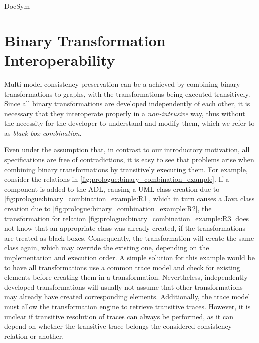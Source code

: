 \begin{copiedFrom}{DocSym}

\section{Binary Transformation Interoperability}

Multi-model consistency preservation can be a achieved by combining binary transformations to graphs, %
with the transformations being executed transitively.
Since all binary transformations are developed independently of each other, it is necessary that they interoperate properly in a \emph{non-intrusive} way, thus without the necessity for the developer to understand and modify them, which we refer to as \emph{black-box combination}.

Even under the assumption that, in contrast to our introductory motivation, all specifications are free of contradictions, it is easy to see that problems arise when combining binary transformations by transitively executing them.
For example, consider the relations in \autoref{fig:prologue:binary_combination_example}.
If a component is added to the \ac{ADL}, causing a \ac{UML} class creation due to \ref{fig:prologue:binary_combination_example:R1}, which in turn causes a Java class creation due to \ref{fig:prologue:binary_combination_example:R2}, the transformation for relation \ref{fig:prologue:binary_combination_example:R3} does not know that an appropriate class was already created, if the transformations are treated as black boxes.
Consequently, the transformation will create the same class again, which may override the existing one, depending on the implementation and execution order.
A simple solution for this example would be to have all transformations use a common trace model and check for existing elements before creating them in a transformation.
Nevertheless, independently developed transformations will usually not assume that %
other transformations may already have created corresponding elements.
Additionally, the trace model must allow the transformation engine to retrieve transitive traces.
However, it is unclear if transitive resolution of traces can always be performed, as it can depend on whether the transitive trace belongs the considered consistency relation or another.


\end{copiedFrom}
